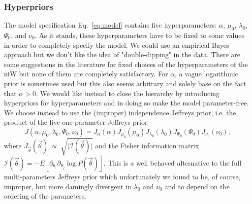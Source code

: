 \documentclass[11pt, oneside]{article}   	%
\begin{document}
\subsubsection{Hyperpriors}
The model specification Eq.~\ref{eq:model} contains five hyperparameters: $\alpha$, $\mu_0$, $\lambda_0$, $\Psi_0$, and $\nu_0$. As it stands, these hyperparameters have to be fixed to some values in order to completely specify the model. We could use an empirical Bayes approach but we don't like the idea of "double-dipping" in the data. There are some suggestions in the literature for fixed choices of the hyperparameters of the niW but none of them are completely satisfactory. For $\alpha$, a vague logarithmic prior is sometimes used but this also seems arbitrary and solely base on the fact that $\alpha > 0$. We would like instead to close the hierarchy by introducing hyperpriors for hyperparameters and in doing so make the model parameter-free. We choose instead to use the (improper) independence Jeffreys prior, i.e. the product of the five one-parameter Jeffreys prior
$$J(\alpha,\mu_0,\lambda_0,\Psi_0,\nu_0)=J_\alpha (\alpha) J_{\mu_0}(\mu_0) J_{\lambda_0}(\lambda_0) J_{\Psi_0}(\Psi_0) J_{\nu_0}(\nu_0),$$
where $J_{\vec \theta}(\vec \theta)~\propto~\sqrt{\vert\mathcal I(\vec \theta)\vert}$ and the Fisher information matrix $\mathcal I(\vec\theta) = -E[\partial_{\theta_i}\partial_{\theta_j} \log P(\vec\theta)]$. This is a well behaved alternative to the full multi-parameters Jeffreys prior which unfortunately we found to be, of course, improper, but more damingly divergent in $\lambda_0$ and $\nu_0$ and to depend on the ordering of the parameters.
\end{document}
